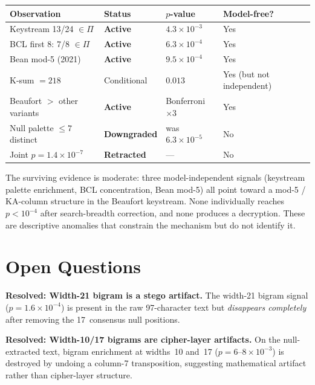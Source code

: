 \documentclass[11pt]{article}
\theoremstyle{remark}
\begin{document}
\begin{center}
\begin{tabular}{llll}
\toprule
Observation & Status & $p$-value & Model-free? \\
\midrule
Keystream 13/24 $\in \Pi$ & \textbf{Active} & $4.3 \times 10^{-3}$ & Yes \\
BCL first 8: 7/8 $\in \Pi$ & \textbf{Active} & $6.3 \times 10^{-4}$ & Yes \\
Bean mod-5 (2021) & \textbf{Active} & $9.5 \times 10^{-4}$ & Yes \\
K-sum $= 218$ & Conditional & $0.013$ & Yes (but not independent) \\
Beaufort $>$ other variants & \textbf{Active} & Bonferroni $\times 3$ & Yes \\
\midrule
Null palette $\leq 7$ distinct & \textbf{Downgraded} & was $6.3 \times 10^{-5}$ & No \\
Joint $p = 1.4 \times 10^{-7}$ & \textbf{Retracted} & --- & No \\
\bottomrule
\end{tabular}
\end{center}

The surviving evidence is moderate: three model-independent signals
(keystream palette enrichment, BCL concentration, Bean mod-5) all
point toward a mod-5 / KA-column structure in the Beaufort keystream.
None individually reaches $p < 10^{-4}$ after search-breadth
correction, and none produces a decryption.  These are descriptive
anomalies that constrain the mechanism but do not identify it.

\section{Open Questions}

\noindent\textbf{Resolved: Width-21 bigram is a stego artifact.}
The width-21 bigram signal ($p = 1.6 \times 10^{-4}$) is present in
the raw 97-character text but \emph{disappears completely} after
removing the 17~consensus null positions.

\medskip
\noindent\textbf{Resolved: Width-10/17 bigrams are cipher-layer artifacts.}
On the null-extracted text, bigram enrichment at widths~10
and~17 ($p = 6$--$8 \times 10^{-3}$) is destroyed by undoing a
column-7 transposition, suggesting mathematical artifact rather
than cipher-layer structure.
\end{document}

